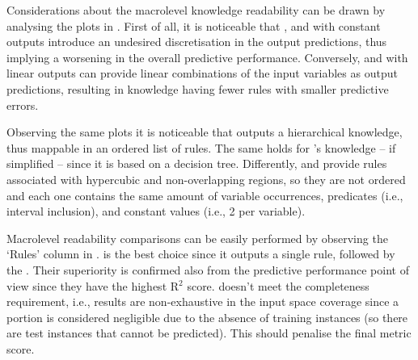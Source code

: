 \documentclass[sigconf]{acmart}
\begin{document}
Considerations about the macrolevel knowledge readability can be drawn by analysing the plots in .
%
First of all, it is noticeable that \cart{}, \gridex{} and \creepy{} with constant outputs introduce an undesired discretisation in the output predictions, thus implying a worsening in the overall predictive performance.
%
Conversely, \gridrex{} and \creepy{} with linear outputs can provide linear combinations of the input variables as output predictions, resulting in knowledge having fewer rules with smaller predictive errors.

Observing the same plots it is noticeable that \creepy{} outputs a hierarchical knowledge, thus mappable in an ordered list of rules.
%
The same holds for \cart{}'s knowledge -- if simplified -- since it is based on a decision tree.
%
Differently, \gridex{} and \gridex{} provide rules associated with hypercubic and non-overlapping regions, so they are not ordered and each one contains the same amount of variable occurrences, predicates (i.e., interval inclusion), and constant values (i.e., 2 per variable).

Macrolevel readability comparisons can be easily performed by observing the `Rules' column in .
%
\gridrex{} is the best choice since it outputs a single rule, followed by the \creepy{}.%
%
Their superiority is confirmed also from the predictive performance point of view since they have the highest R$^2$ score.
%
\gridrex{} doesn't meet the completeness requirement, i.e., results are non-exhaustive in the input space coverage since a portion is considered negligible due to the absence of training instances (so there are test instances that cannot be predicted). This should penalise the final metric score.
\end{document}
